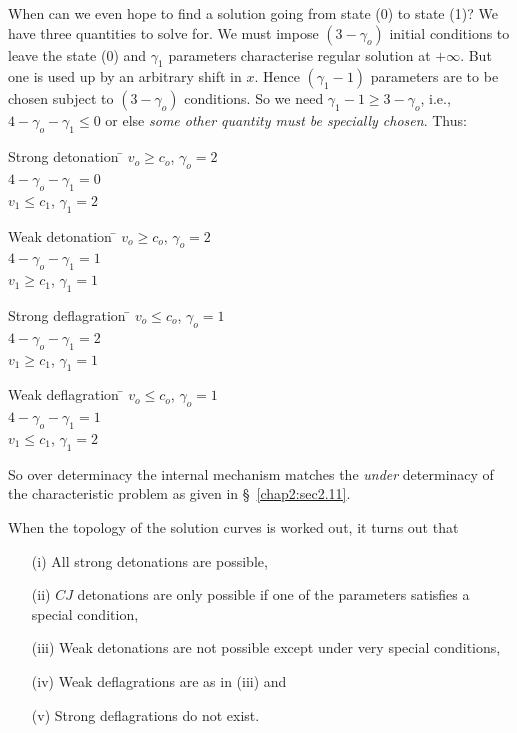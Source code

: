 When can we even hope to find a solution going from state (0) to state (1)? We have three quantities to solve for. We must impose $(3-\gamma_o)$ initial conditions to leave the state (0) and $\gamma_1$ parameters characterise regular solution at $+ \infty$. But one is used up by an arbitrary shift in $x$. Hence $(\gamma_1-1)$ parameters are to be chosen subject to $(3-\gamma_o)$ conditions. So we need $\gamma_1 - 1 \geq 3 - \gamma_o$, i.e., $4-\gamma_o - \gamma_1 \leq 0$ or else {\em some other quantity must be specially chosen}. Thus:
\begin{tabbing}
Strong detonation \quad  \= $v_o \geq c_o$, \; $\gamma_o = 2$  \=  \\
\> \> $4 - \gamma_o - \gamma_1 = 0$\\
\>  $v_1 \leq c_1$, \; $\gamma_1 = 2$ \> 
\end{tabbing}
\begin{tabbing}
Weak detonation \quad  \= $v_o \geq c_o$, \; $\gamma_o = 2$  \=  \\
\> \> $4 - \gamma_o - \gamma_1 = 1$\\
\>  $v_1 \geq c_1$, \; $\gamma_1 = 1$ \> 
\end{tabbing}\pageoriginale
\begin{tabbing}
Strong deflagration \quad  \= $v_o \leq c_o$, \; $\gamma_o = 1$  \=  \\
\> \> $4 - \gamma_o - \gamma_1 = 2$\\
\>  $v_1 \geq c_1$, \; $\gamma_1 = 1$ \> 
\end{tabbing}
\begin{tabbing}
Weak deflagration \quad  \= $v_o \leq c_o$, \; $\gamma_o = 1$  \=  \\
\> \> $4 - \gamma_o - \gamma_1 = 1$\\
\>  $v_1 \leq c_1$, \; $\gamma_1 = 2$ \> 
\end{tabbing}

So over determinacy the internal mechanism matches the {\em under} determinacy of the characteristic problem as given in \S\ \ref{chap2:sec2.11}. 

When the topology of the solution curves is worked out, it turns out that
\begin{itemize}
\item[{\rm (i)}] All strong detonations are possible,

\item[{\rm (ii)}] $CJ$ detonations are only possible if one of the parameters satisfies a special condition, 

\item[{\rm (iii)}] Weak detonations are not possible except under very special conditions,

\item[{\rm (iv)}] Weak deflagrations are as in (iii) and 

\item[{\rm (v)}] Strong deflagrations do not exist.
\end{itemize}
